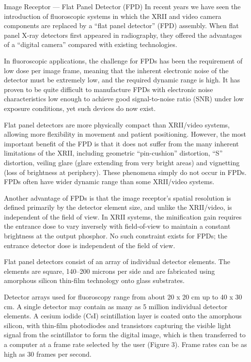 \documentclass{assignment}
\begin{document}
\begin{problem}
{Image Receptor — Flat Panel Detector (FPD)
In recent years we have seen the introduction of fluoroscopic systems in which the XRII and video camera components are replaced by a “flat panel detector” (FPD) assembly. When flat panel X-ray detectors first appeared in radiography, they offered the advantages of a “digital camera” compared with existing technologies.

In fluoroscopic applications, the challenge for FPDs has been the requirement of low dose per image frame, meaning that the inherent electronic noise of the detector must be extremely low, and the required dynamic range is high. It has proven to be quite difficult to manufacture FPDs with electronic noise characteristics low enough to achieve good signal-to-noise ratio (SNR) under low exposure conditions, yet such devices do now exist.

Flat panel detectors are more physically compact than XRII/video systems, allowing more flexibility in movement and patient positioning. However, the most important benefit of the FPD is that it does not suffer from the many inherent limitations of the XRII, including geometric “pin-cushion” distortion, “S” distortion, veiling glare (glare extending from very bright areas) and vignetting (loss of brightness at periphery). These phenomena simply do not occur in FPDs. FPDs often have wider dynamic range than some XRII/video systems.

Another advantage of FPDs is that the image receptor’s spatial resolution is defined primarily by the detector element size, and unlike the XRII/video, is independent of the field of view. In XRII systems, the minification gain requires the entrance dose to vary inversely with field-of-view to maintain a constant brightness at the output phosphor. No such constraint exists for FPDs; the entrance detector dose is independent of the field of view.

Flat panel detectors consist of an array of individual detector elements. The elements are square, 140–200 microns per side and are fabricated using amorphous silicon thin-film technology onto glass substrates.

Detector arrays used for fluoroscopy range from about 20 x 20 cm up to 40 x 30 cm. A single detector may contain as many as 5 million individual detector elements. A cesium iodide (CsI) scintillation layer is coated onto the amorphous silicon, with thin-film photodiodes and transistors capturing the visible light signal from the scintillator to form the digital image, which is then transferred to a computer at a frame rate selected by the user (Figure 3). Frame rates can be as high as 30 frames per second.

}
\end{problem}
\end{document}
